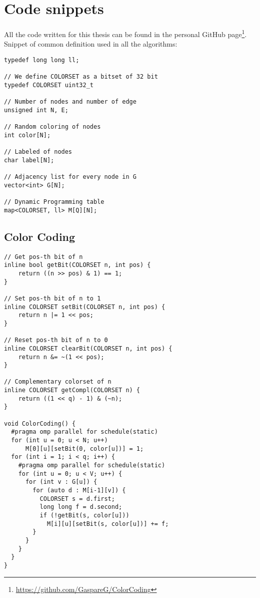 

\chapter{Code snippets}
  
 All the code written for this thesis can be found in the personal GitHub page\footnote{\url{https://github.com/GaspareG/ColorCoding}}.\\

Snippet of common definition used in all the algorithms:

\begin{lstlisting}
typedef long long ll;

// We define COLORSET as a bitset of 32 bit
typedef COLORSET uint32_t

// Number of nodes and number of edge
unsigned int N, E;

// Random coloring of nodes
int color[N];

// Labeled of nodes
char label[N];

// Adjacency list for every node in G
vector<int> G[N];

// Dynamic Programming table
map<COLORSET, ll> M[Q][N];
\end{lstlisting}

\clearpage


\section*{Color Coding}

\begin{lstlisting}
// Get pos-th bit of n
inline bool getBit(COLORSET n, int pos) { 
	return ((n >> pos) & 1) == 1; 
}

// Set pos-th bit of n to 1
inline COLORSET setBit(COLORSET n, int pos) { 
	return n |= 1 << pos; 
}

// Reset pos-th bit of n to 0
inline COLORSET clearBit(COLORSET n, int pos) { 
	return n &= ~(1 << pos); 
}

// Complementary colorset of n
inline COLORSET getCompl(COLORSET n) { 
	return ((1 << q) - 1) & (~n); 
}

void ColorCoding() {
  #pragma omp parallel for schedule(static)
  for (int u = 0; u < N; u++) 
	  M[0][u][setBit(0, color[u])] = 1;
  for (int i = 1; i < q; i++) {
    #pragma omp parallel for schedule(static)
    for (int u = 0; u < V; u++) {
      for (int v : G[u]) {
        for (auto d : M[i-1][v]) {
          COLORSET s = d.first;
          long long f = d.second;
          if (!getBit(s, color[u]))
            M[i][u][setBit(s, color[u])] += f;
        }
      }
    }
  }
}
\end{lstlisting}



